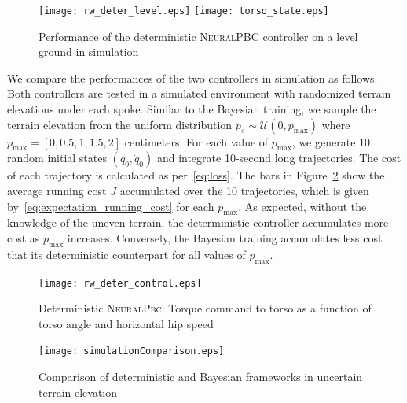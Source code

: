 \begin{figure}[tb]
    \centering
    \texttt{[image: rw\_deter\_level.eps]}\hfill
    \texttt{[image: torso\_state.eps]}
    \caption{Performance of the deterministic \textsc{NeuralPBC} controller on a level ground in simulation}
    \label{fig:deter_rw_level}
\end{figure}
%
We compare the performances of the two controllers in simulation as follows.
%
Both controllers are tested in a simulated environment with randomized terrain
elevations under each spoke.
%
Similar to the Bayesian training, we sample the terrain elevation from the
uniform distribution $p_s \sim \mathcal{U}(0, p_{\text{max}})$ where
$p_{\text{max}} = [0, 0.5, 1, 1.5, 2]$ centimeters.
%
For each value of $p_{\text{max}}$, we generate 10 random initial states $(q_0,
\dot{q}_0)$ and integrate 10-second long trajectories.
%
The cost of each trajectory is calculated as per~\eqref{eq:loss}.
%
The bars in Figure~\ref{fig:simulationComparison} show the average running cost
$J$ accumulated over the 10 trajectories, which is given
by~\eqref{eq:expectation_running_cost} for each $p_{\text{max}}$.
%
As expected, without the knowledge of the uneven terrain, the deterministic controller
accumulates more cost as $p_{\text{max}}$ increases.
%
Conversely, the Bayesian training accumulates less cost that its deterministic
counterpart for all values of $p_{\text{max}}$.
%

\begin{figure}[tb]
    \centering
    \begin{minipage}{0.48\linewidth}
        \texttt{[image: rw\_deter\_control.eps]}
        \caption{Deterministic \textsc{NeuralPbc}: Torque command to torso as a function of torso angle and horizontal hip speed}
        \label{fig:deter_control}
    \end{minipage}\hfill
    \begin{minipage}{0.48\linewidth}
        \texttt{[image: simulationComparison.eps]}    
        \caption{Comparison of deterministic and Bayesian frameworks in uncertain terrain elevation}
        \label{fig:simulationComparison}    
    \end{minipage}
\end{figure}

